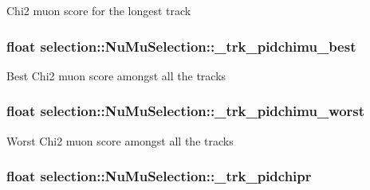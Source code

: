 Chi2 muon score for the longest track \hypertarget{classselection_1_1NuMuSelection_a5bdc83ae76241b73654f99768ea43ffb}{
\subsubsection[{\-\_\-trk\-\_\-pidchimu\-\_\-best}]{\setlength{\rightskip}{0pt plus 5cm}float selection\-::\-Nu\-Mu\-Selection\-::\-\_\-trk\-\_\-pidchimu\-\_\-best\hspace{0.3cm}{\ttfamily [private]}}}\label{classselection_1_1NuMuSelection_a5bdc83ae76241b73654f99768ea43ffb}
Best Chi2 muon score amongst all the tracks \hypertarget{classselection_1_1NuMuSelection_ad1761cb4833e688d27f6f95321156136}{
\subsubsection[{\-\_\-trk\-\_\-pidchimu\-\_\-worst}]{\setlength{\rightskip}{0pt plus 5cm}float selection\-::\-Nu\-Mu\-Selection\-::\-\_\-trk\-\_\-pidchimu\-\_\-worst\hspace{0.3cm}{\ttfamily [private]}}}\label{classselection_1_1NuMuSelection_ad1761cb4833e688d27f6f95321156136}
Worst Chi2 muon score amongst all the tracks \hypertarget{classselection_1_1NuMuSelection_af65eea94c4d2811de82693751684131d}{
\subsubsection[{\-\_\-trk\-\_\-pidchipr}]{\setlength{\rightskip}{0pt plus 5cm}float selection\-::\-Nu\-Mu\-Selection\-::\-\_\-trk\-\_\-pidchipr\hspace{0.3cm}{\ttfamily [private]}}}\label{classselection_1_1NuMuSelection_af65eea94c4d2811de82693751684131d}
